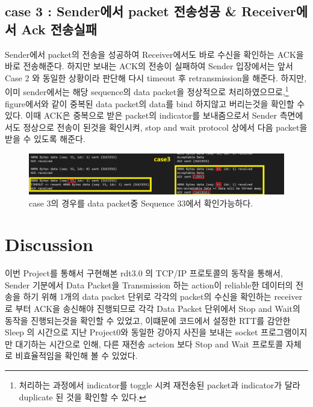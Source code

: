 	\subsection*{case 3 : Sender에서 packet 전송성공 \& Receiver에서 Ack 전송실패}
	Sender에서 packet의 전송을 성공하여 Receiver에서도 바로 수신을 확인하는 ACK을 바로 전송해준다.
	하지만 보내는 ACK의 전송이 실패하여 Sender 입장에서는 앞서 Case 2 와 동일한 상황이라 판단해 
	다시 timeout 후 retransmission을 해준다. 하지만, 이미 sender에서는 해당 sequence의 data packet을
	정상적으로 처리하였으므로,\footnote{처리하는 과정에서 indicator를 toggle 시켜 재전송된 packet과 indicator가 달라 duplicate 된 것을 확인할 수 있다.}
	figure에서와 같이 중복된 data packet의 data를 bind 하지않고 버리는것을 확인할 수 있다. 이때 ACK은 중복으로 받은 packet의 indicator를 보내줌으로서 
	Sender 측면에서도 정상으로 전송이 된것을 확인시켜, stop and wait protocol 상에서 다음 packet을 받을 수 있도록 해준다.\\
\vspace{-2mm}
	\begin{figure}[!h]
		\centering
			\includegraphics[width=\textwidth]{image/case3.jpg}
			\caption{case 3의 경우를 data packet중 Sequence 33에서 확인가능하다.}
	\end{figure}
\vspace{-8mm}
	\section*{Discussion}
    이번 Project를 통해서 구현해본 rdt3.0 의 TCP/IP 프로토콜의 동작을 통해서, Sender 기분에서 Data Packet을 Transmission 하는 action이 
    reliable한 데이터의 전송을 하기 위해 1개의 data packet 단위로 각각의 packet의 수신을 확인하는 receiver로 부터 ACK을 송신해야 진행되므로
    각각 Data Packet 단위에서 Stop and Wait의 동작을 진행되는것을 확인할 수 있었고, 이떄문에 코드에서 설정한 RTT를 감안한 Sleep 의 시간으로 지난 Project0와 동일한 강아지 사진을 보내는 socket 프로그램이지만 대기하는 시간으로 인해, 다른 재전송 acteion 보다 Stop and Wait 프로토콜 자체로 비효율적임을 확인해 볼 수 있었다.
    
